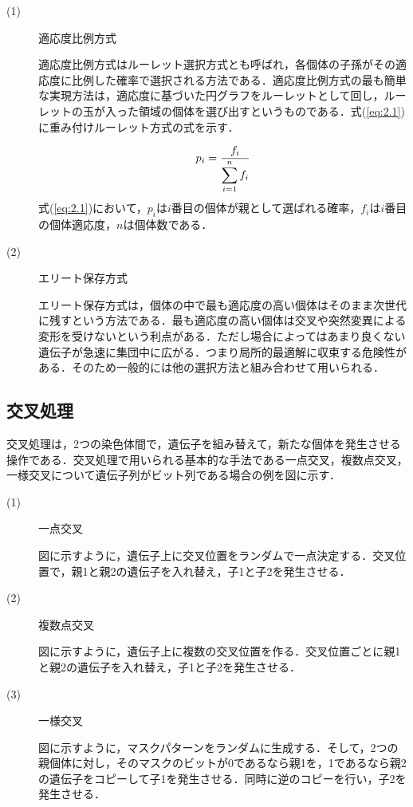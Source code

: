 \begin{description}
\item[ (1) ]適応度比例方式

適応度比例方式はルーレット選択方式とも呼ばれ，各個体の子孫がその適応度に比例した確率で選択される方法である．適応度比例方式の最も簡単な実現方法は，適応度に基づいた円グラフをルーレットとして回し，ルーレットの玉が入った領域の個体を選び出すというものである．式(\ref{eq:2.1})に重み付けルーレット方式の式を示す．



\begin{equation}
\vspace{1.0cm}
{p_i}=\frac{f_i}{\displaystyle\sum_{i=1}^{n}f_i}
\label{eq:2.1}
\vspace{-0.5cm}
\end{equation}
式(\ref{eq:2.1})において，$p_i$は$i$番目の個体が親として選ばれる確率，$f_i$は$i$番目の個体適応度，$n$は個体数である．

\item[ (2) ]エリート保存方式

エリート保存方式は，個体の中で最も適応度の高い個体はそのまま次世代に残すという方法である．最も適応度の高い個体は交叉や突然変異による変形を受けないという利点がある．ただし場合によってはあまり良くない遺伝子が急速に集団中に広がる．つまり局所的最適解に収束する危険性がある．そのため一般的には他の選択方法と組み合わせて用いられる．

\end{description}

\newpage

\subsection{交叉処理}
\label{sec2.1.4}

交叉処理は，2つの染色体間で，遺伝子を組み替えて，新たな個体を発生させる操作である．交叉処理で用いられる基本的な手法である一点交叉，複数点交叉，一様交叉について遺伝子列がビット列である場合の例を図に示す．



\begin{description}
\item[ (1) ]一点交叉

図に示すように，遺伝子上に交叉位置をランダムで一点決定する．交叉位置で，親1と親2の遺伝子を入れ替え，子1と子2を発生させる．


\item[ (2) ]複数点交叉

図に示すように，遺伝子上に複数の交叉位置を作る．交叉位置ごとに親1と親2の遺伝子を入れ替え，子1と子2を発生させる．

\item[ (3) ]一様交叉

図に示すように，マスクパターンをランダムに生成する．そして，2つの親個体に対し，そのマスクのビットが0であるなら親1を，1であるなら親2の遺伝子をコピーして子1を発生させる．同時に逆のコピーを行い，子2を発生させる．

\end{description}

